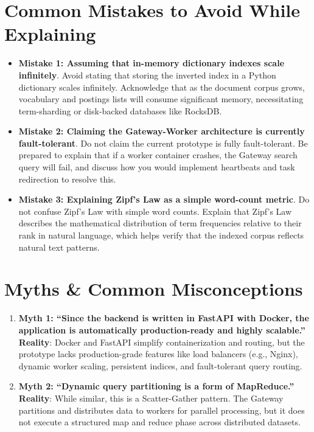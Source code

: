 \documentclass[11pt,a4paper]{article}
\begin{document}
\begin{itemize}
\section{Common Mistakes to Avoid While Explaining}

\begin{itemize}
    \item \textbf{Mistake 1: Assuming that in-memory dictionary indexes scale infinitely}.
    Avoid stating that storing the inverted index in a Python dictionary scales infinitely. Acknowledge that as the document corpus grows, vocabulary and postings lists will consume significant memory, necessitating term-sharding or disk-backed databases like RocksDB.
    
    \item \textbf{Mistake 2: Claiming the Gateway-Worker architecture is currently fault-tolerant}.
    Do not claim the current prototype is fully fault-tolerant. Be prepared to explain that if a worker container crashes, the Gateway search query will fail, and discuss how you would implement heartbeats and task redirection to resolve this.
    
    \item \textbf{Mistake 3: Explaining Zipf's Law as a simple word-count metric}.
    Do not confuse Zipf's Law with simple word counts. Explain that Zipf's Law describes the mathematical distribution of term frequencies relative to their rank in natural language, which helps verify that the indexed corpus reflects natural text patterns.
\end{itemize}

\section{Myths \& Common Misconceptions}

\begin{enumerate}
    \item \textbf{Myth 1: ``Since the backend is written in FastAPI with Docker, the application is automatically production-ready and highly scalable.''}
    \\ \textbf{Reality}: Docker and FastAPI simplify containerization and routing, but the prototype lacks production-grade features like load balancers (e.g., Nginx), dynamic worker scaling, persistent indices, and fault-tolerant query routing.

    \item \textbf{Myth 2: ``Dynamic query partitioning is a form of MapReduce.''}
    \\ \textbf{Reality}: While similar, this is a Scatter-Gather pattern. The Gateway partitions and distributes data to workers for parallel processing, but it does not execute a structured map and reduce phase across distributed datasets.


\end{enumerate}
\end{itemize}
\end{document}
